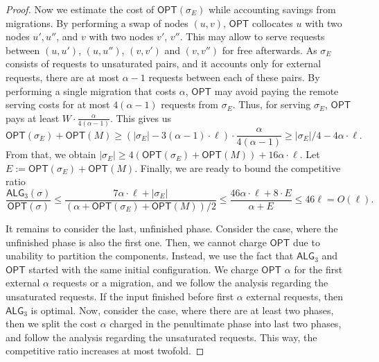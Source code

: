 \documentclass[manuscript,screen=true, review, anonymous]{acmart}
\newcommand{\OPT}{\textsf{OPT}\xspace}
\newcommand{\TAlg}{{\ensuremath{\textsf{ALG}_{3}}}\xspace} %
\begin{document}
\begin{proof}
  Now we estimate the cost of $\OPT(\sigma_E)$ while accounting savings from migrations.
  By performing a swap of nodes $(u,v)$, $\OPT$ collocates $u$ with two nodes $u', u''$, and $v$ with two nodes $v'$, $v''$.
  This may allow to serve requests between $(u,u')$, $(u,u'')$, $(v,v')$ and $(v,v'')$ for free afterwards.
  As $\sigma_E$ consists of requests to unsaturated pairs, and it accounts only for external requests, there are at most $\alpha-1$ requests between each of these pairs.
  By performing a single migration that costs $\alpha$, $\OPT$ may avoid paying the remote serving costs for at most $4 (\alpha - 1)$ requests from $\sigma_E$.
  Thus, for serving $\sigma_E$, $\OPT$ pays at least $W \cdot \frac{\alpha}{4 (\alpha-1)}$.
  This gives us
  \begin{equation*}
    \OPT(\sigma_E) + \OPT(M)  \geq (|\sigma_E|-3(\alpha - 1)\cdot \ell) \cdot \frac{\alpha}{4 (\alpha-1)}
    \geq |\sigma_E| / 4 - 4 \alpha \cdot \ell.
  \end{equation*}
  From that, we obtain $|\sigma_E| \geq 4(\OPT(\sigma_E)+\OPT(M)) + 16\alpha \cdot \ell$.
  Let $E := \OPT(\sigma_E) + \OPT(M)$. Finally, we are ready to bound the competitive ratio
  \begin{equation*}
    \frac{\TAlg(\sigma)}{\OPT(\sigma)} \leq \frac{7\alpha \cdot \ell + |\sigma_E|}{(\alpha + \OPT(\sigma_E) + \OPT(M))/2} \leq \frac{46\alpha\cdot\ell + 8\cdot E}{\alpha + E} \leq 46 \ell = O(\ell).
  \end{equation*}

  \medskip

  It remains to consider the last, unfinished phase.
  Consider the case, where the unfinished phase is also the first one.
  Then, we cannot charge $\OPT$ due to unability to partition the components.
  Instead, we use the fact that \TAlg and $\OPT$ started with the same initial configuration.
  We charge $\OPT$ $\alpha$ for the first external $\alpha$ requests or a migration,
  and we follow the analysis regarding the unsaturated requests.
  If the input finished before first $\alpha$ external requests, then \TAlg is optimal.
  Now, consider the case, where there are at least two phases, then we split the cost $\alpha$ charged in the penultimate phase into last two phases, and follow the analysis regarding the unsaturated requests.
  This way, the competitive ratio increases at most twofold.
\end{proof}



  
\end{document}
